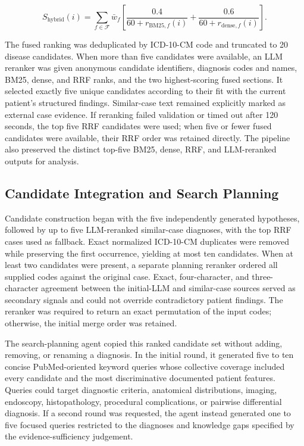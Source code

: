 \documentclass[10pt,letterpaper]{article}
\begin{document}
\begin{equation}
  S_{\mathrm{hybrid}}(i)=\sum_{f\in\mathcal{F}}\bar{w}_f
  \left[
  \frac{0.4}{60+r_{\mathrm{BM25},f}(i)}+
  \frac{0.6}{60+r_{\mathrm{dense},f}(i)}
  \right].
\end{equation}

The fused ranking was deduplicated by ICD-10-CM code and truncated to 20 disease
candidates. When more than five candidates were available, an LLM reranker was
given anonymous candidate identifiers, diagnosis codes and names, BM25, dense,
and RRF ranks, and the two highest-scoring fused sections. It selected exactly
five unique candidates according to their fit with the current patient's
structured findings. Similar-case text remained explicitly marked as external
case evidence. If reranking failed validation or timed out after 120 seconds, the
top five RRF candidates were used; when five or fewer fused candidates were
available, their RRF order was retained directly. The pipeline also preserved
the distinct top-five BM25, dense, RRF, and LLM-reranked outputs for analysis.

\subsection{Candidate Integration and Search Planning}

Candidate construction began with the five independently generated hypotheses,
followed by up to five LLM-reranked similar-case diagnoses, with the top RRF cases
used as fallback. Exact normalized ICD-10-CM duplicates were removed while
preserving the first occurrence, yielding at most ten candidates. When at least
two candidates were present, a separate planning reranker ordered all supplied
codes against the original case. Exact, four-character, and three-character
agreement between the initial-LLM and similar-case sources served as secondary
signals and could not override contradictory patient findings. The reranker was
required to return an exact permutation of the input codes; otherwise, the
initial merge order was retained.

The search-planning agent copied this ranked candidate set without adding,
removing, or renaming a diagnosis. In the initial round, it generated five to ten
concise PubMed-oriented keyword queries whose collective coverage included every
candidate and the most discriminative documented patient features. Queries could
target diagnostic criteria, anatomical distributions, imaging, endoscopy,
histopathology, procedural complications, or pairwise differential diagnosis.
If a second round was requested, the agent instead generated one to five focused
queries restricted to the diagnoses and knowledge gaps specified by the
evidence-sufficiency judgement.
\end{document}
